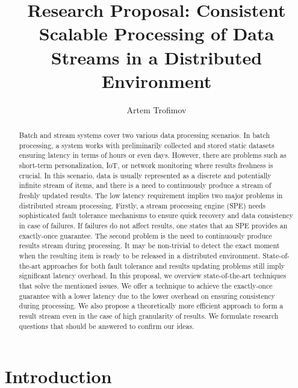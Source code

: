 \documentclass[runningheads]{llncs}
\begin{document}
\title {Research Proposal: Consistent Scalable Processing of Data Streams in  a Distributed Environment
}
\author{Artem Trofimov}

\maketitle

\begin{abstract}
Batch and stream systems cover two various data processing scenarios. In batch processing, a system works with preliminarily collected and stored static datasets ensuring latency in terms of hours or even days. However, there are problems such as short-term personalization, IoT, or network monitoring where results freshness is crucial. In this scenario, data is usually represented as a discrete and potentially infinite stream of items, and there is a need to continuously produce a stream of freshly updated results. 
The low latency requirement implies two major problems in distributed stream processing. Firstly, a stream processing engine (SPE) needs sophisticated fault tolerance mechanisms to ensure quick recovery and data consistency in case of failures. 
If failures do not affect results, one states that an SPE provides an exactly-once guarantee. 
The second problem is the need to continuously produce results stream during processing. It may be non-trivial to detect the exact moment when the resulting item is ready to be released in a distributed environment. State-of-the-art approaches for both fault tolerance and results updating problems still imply significant latency overhead. 
In this proposal, we overview state-of-the-art techniques that solve the mentioned issues. We offer a technique to achieve the exactly-once guarantee with a lower latency due to the lower overhead on ensuring consistency during processing. We also propose a theoretically more efficient approach to form a result stream even in the case of high granularity of results. We formulate research questions that should be answered to confirm our ideas. 
\end{abstract}

\section {Introduction}
\end{document}
